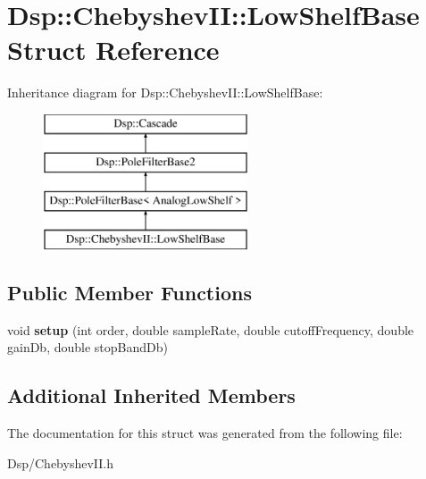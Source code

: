 \hypertarget{structDsp_1_1ChebyshevII_1_1LowShelfBase}{\section{Dsp\-:\-:Chebyshev\-I\-I\-:\-:Low\-Shelf\-Base Struct Reference}
\label{structDsp_1_1ChebyshevII_1_1LowShelfBase}
}
Inheritance diagram for Dsp\-:\-:Chebyshev\-I\-I\-:\-:Low\-Shelf\-Base\-:\begin{figure}[H]
\begin{center}
\leavevmode
\includegraphics[height=4.000000cm]{structDsp_1_1ChebyshevII_1_1LowShelfBase}
\end{center}
\end{figure}
\subsection*{Public Member Functions}
\begin{DoxyCompactItemize}
\item 
\hypertarget{structDsp_1_1ChebyshevII_1_1LowShelfBase_abbcff91546447af10faa1b27d246faf9}{void {\bfseries setup} (int order, double sample\-Rate, double cutoff\-Frequency, double gain\-Db, double stop\-Band\-Db)}\label{structDsp_1_1ChebyshevII_1_1LowShelfBase_abbcff91546447af10faa1b27d246faf9}

\end{DoxyCompactItemize}
\subsection*{Additional Inherited Members}


The documentation for this struct was generated from the following file\-:\begin{DoxyCompactItemize}
\item 
Dsp/Chebyshev\-I\-I.\-h\end{DoxyCompactItemize}
